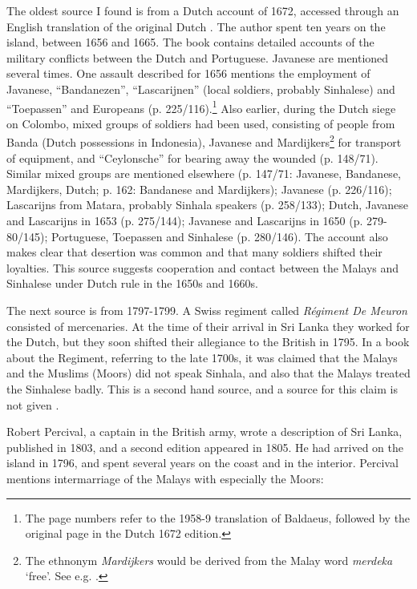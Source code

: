 The oldest source I found is from a Dutch account of 1672, accessed through an English translation of the original Dutch \citep{Baldaeus19581959}. The author  spent ten years on the island, between 1656 and 1665. The book contains detailed accounts of the military conflicts between the Dutch and Portuguese. Javanese are mentioned several times. One assault described for 1656 mentions the employment of Javanese, ``Bandanezen'', ``Lascarijnen'' (local soldiers, probably Sinhalese) and ``Toepassen'' \citep[free indigenous Christians, or descendants of Portuguese fathers and indigenous mothers;][]{Veth1889} and Europeans (p. 225/116).\footnote{The
 page numbers refer to the 1958-9 translation of Baldaeus, followed by the original page in the Dutch 1672 edition.
}
Also earlier, during the Dutch siege on Colombo, mixed groups of soldiers had been used, consisting of  people from Banda (Dutch possessions in Indonesia), Javanese and Mardijkers\footnote{The
 ethnonym {\em Mardijkers} would be derived from the Malay word {\em merdeka} `free'. See e.g. \citet{Veth1889}.
 }
\citep[free indigenous people, probably from Dutch possessions;][110ff]{Veth1889} for transport of equipment, and ``Ceylonsche''  for bearing away the wounded (p. 148/71). Similar mixed groups are mentioned elsewhere (p. 147/71: Javanese, Bandanese, Mardijkers, Dutch; p. 162: Bandanese and Mardijkers);   Javanese (p. 226/116); Lascarijns from Matara, probably Sinhala speakers (p. 258/133); Dutch, Javanese and Lascarijns in 1653 (p. 275/144); Javanese and Lascarijns in 1650 (p. 279-80/145); Portuguese, Toepassen and Sinhalese (p. 280/146).  The account also makes clear that desertion was common and that many soldiers shifted their loyalties. This source suggests cooperation and contact between the Malays and Sinhalese under Dutch rule in the 1650s and 1660s.

The next source  is from 1797-1799. A Swiss regiment called \textit{Régiment De Meuron} consisted of mercenaries. At the time of their arrival in Sri Lanka they worked for the Dutch, but they soon shifted their allegiance to the British in 1795. In a book about the Regiment, referring to the late 1700s, it was claimed that the Malays and the Muslims (Moors) did not speak Sinhala, and also that the Malays treated the Sinhalese badly. This is a second hand source, and a source for this claim is not given \citep[155]{DeMeuron1982}.

Robert Percival, a captain in the British army, wrote a description of Sri Lanka, published in 1803, and a second edition appeared in 1805. He had arrived on the island in 1796, and spent several years on the coast and in the interior. Percival mentions intermarriage of the Malays with especially the Moors: 

